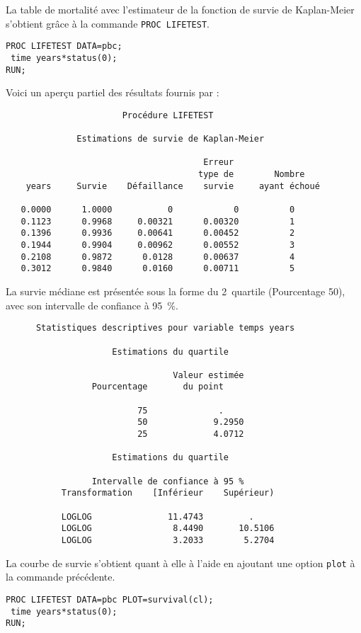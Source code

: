 
La table de mortalité avec l'estimateur de la fonction de survie de
Kaplan-Meier s'obtient grâce à la commande \verb|PROC LIFETEST|.
\begin{verbatim}
PROC LIFETEST DATA=pbc;
 time years*status(0);
RUN;
\end{verbatim}
Voici un aperçu partiel des résultats fournis par \SAS :
\begin{verbatim}
                       Procédure LIFETEST

              Estimations de survie de Kaplan-Meier

                                       Erreur
                                      type de        Nombre
    years     Survie    Défaillance    survie     ayant échoué

   0.0000      1.0000           0            0          0
   0.1123      0.9968     0.00321      0.00320          1
   0.1396      0.9936     0.00641      0.00452          2
   0.1944      0.9904     0.00962      0.00552          3
   0.2108      0.9872      0.0128      0.00637          4
   0.3012      0.9840      0.0160      0.00711          5
\end{verbatim}

La survie médiane est présentée sous la forme du 2\ieme\ quartile
(Pourcentage 50), avec son intervalle de confiance à 95~\%.
\begin{verbatim}
      Statistiques descriptives pour variable temps years

                     Estimations du quartile

                                 Valeur estimée
                 Pourcentage       du point

                          75              .
                          50             9.2950
                          25             4.0712

                     Estimations du quartile

                 Intervalle de confiance à 95 %
           Transformation    [Inférieur    Supérieur)

           LOGLOG               11.4743         .
           LOGLOG                8.4490       10.5106
           LOGLOG                3.2033        5.2704
\end{verbatim}

La courbe de survie s'obtient quant à elle à l'aide en ajoutant une option
\verb|plot| à la commande précédente.
\begin{verbatim}
PROC LIFETEST DATA=pbc PLOT=survival(cl);
 time years*status(0);
RUN;
\end{verbatim}

